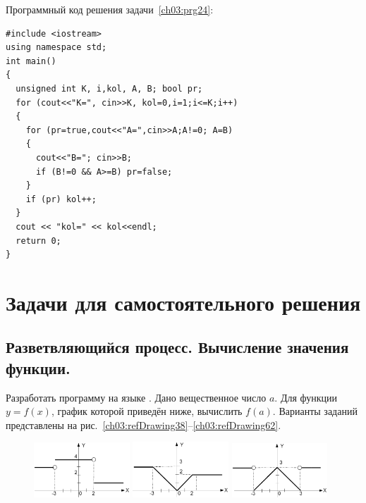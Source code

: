 Программный код решения задачи~\ref{ch03:prg24}:
\begin{lstlisting}
#include <iostream>
using namespace std;
int main()
{
  unsigned int K, i,kol, A, B; bool pr;
  for (cout<<"K=", cin>>K, kol=0,i=1;i<=K;i++)
  {
    for (pr=true,cout<<"A=",cin>>A;A!=0; A=B)
    {
      cout<<"B="; cin>>B;
      if (B!=0 && A>=B) pr=false;
    }
    if (pr) kol++;
  }
  cout << "kol=" << kol<<endl;
  return 0;
}
\end{lstlisting}


\section[Задачи для самостоятельного решения]{Задачи для самостоятельного решения}
\subsection[Разветвляющийся процесс. Вычисление значения функции.]{Разветвляющийся процесс. Вычисление значения
функции.}
Разработать программу на языке . Дано вещественное число $a$. Для функции
$y=f(x)$, график которой приведён ниже, вычислить
$f(a)$. Варианты заданий представлены на рис.~\ref{ch03:refDrawing38}--\ref{ch03:refDrawing62}.

\begin{figure}[h]%
\begin{floatrow}[3]
{\includegraphics[width=0.32\textwidth,keepaspectratio]{img/ris_3_39}}
{\includegraphics[width=0.32\textwidth,keepaspectratio]{img/ris_3_40}}
{\includegraphics[width=0.32\textwidth,keepaspectratio]{img/ris_3_41}}
\end{floatrow}
\end{figure}%


